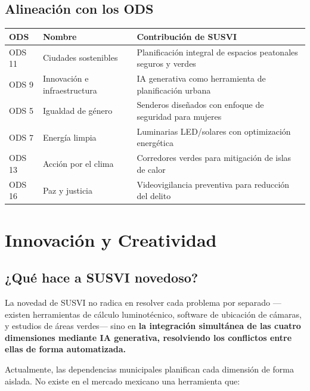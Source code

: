 \documentclass[12pt,a4paper]{article}
\begin{document}
\subsection{Alineación con los ODS}

\begin{table}[H]
\centering
\small
\begin{tabularx}{\textwidth}{l l X}
\toprule
\textbf{ODS} & \textbf{Nombre} & \textbf{Contribución de SUSVI} \\
\midrule
ODS 11 & Ciudades sostenibles & Planificación integral de espacios peatonales seguros y verdes \\
ODS 9 & Innovación e infraestructura & IA generativa como herramienta de planificación urbana \\
ODS 5 & Igualdad de género & Senderos diseñados con enfoque de seguridad para mujeres \\
ODS 7 & Energía limpia & Luminarias LED/solares con optimización energética \\
ODS 13 & Acción por el clima & Corredores verdes para mitigación de islas de calor \\
ODS 16 & Paz y justicia & Videovigilancia preventiva para reducción del delito \\
\bottomrule
\end{tabularx}
\end{table}


\section{Innovación y Creatividad}

\subsection{¿Qué hace a SUSVI novedoso?}

La novedad de SUSVI no radica en resolver cada problema por separado —existen herramientas de cálculo luminotécnico, software de ubicación de cámaras, y estudios de áreas verdes— sino en \textbf{la integración simultánea de las cuatro dimensiones mediante IA generativa, resolviendo los conflictos entre ellas de forma automatizada.}

Actualmente, las dependencias municipales planifican cada dimensión de forma aislada. No existe en el mercado mexicano una herramienta que:
\end{document}

